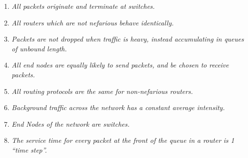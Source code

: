 \begin{enumerate}
\item \emph{All packets originate and terminate at switches.}
\item \emph{All routers which are not nefarious behave identically.}
\item \emph{Packets are not dropped when traffic is heavy, instead accumulating in queues of unbound length.}
\item \emph{All end nodes are equally likely to send packets, and be chosen to receive packets.}
\item \emph{All routing protocols are the same for non-nefarious routers.}
\item \emph{Background traffic across the network has a constant average intensity.}
\item \emph{End Nodes of the network are switches.}
\item \emph{The service time for every packet at the front of the queue in a router is 1 “time step”.}
\end{enumerate}

